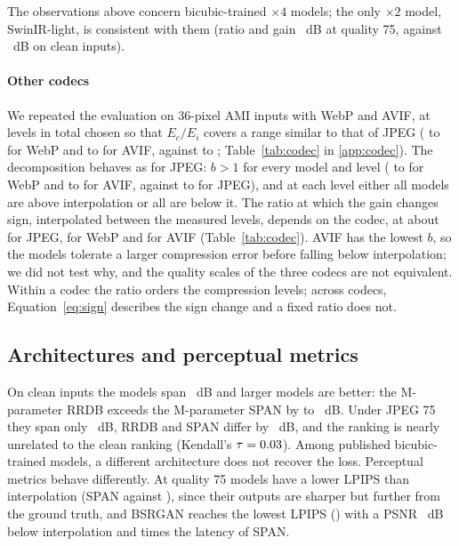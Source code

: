 The observations above concern bicubic-trained $\times4$ models; the only $\times2$ model, SwinIR-light, is consistent with them (ratio \XtwoRatio{} and gain \XtwoGainQLow{}~dB at quality 75, against \XtwoGainClean{}~dB on clean inputs).

\paragraph{Other codecs} We repeated the evaluation on 36-pixel AMI inputs with WebP and AVIF, at \CodecLevels{} levels in total chosen so that $E_c/E_i$ covers a range similar to that of JPEG (\CodecWebpRatioMin{} to \CodecWebpRatioMax{} for WebP and \CodecAvifRatioMin{} to \CodecAvifRatioMax{} for AVIF, against \CodecJpegRatioMin{} to \CodecJpegRatioMax{}; Table~\ref{tab:codec} in \ref{app:codec}). The decomposition behaves as for JPEG: $b>1$ for every model and level (\CodecWebpBMin{} to \CodecWebpBMax{} for WebP and \CodecAvifBMin{} to \CodecAvifBMax{} for AVIF, against \CodecJpegBMin{} to \CodecJpegBMax{} for JPEG), and at each level either all \NPub{} models are above interpolation or all are below it. The ratio at which the gain changes sign, interpolated between the measured levels, depends on the codec, at about \CodecJpegCross{} for JPEG, \CodecWebpCross{} for WebP and \CodecAvifCross{} for AVIF (Table~\ref{tab:codec}). AVIF has the lowest $b$, so the models tolerate a larger compression error before falling below interpolation; we did not test why, and the quality scales of the three codecs are not equivalent. Within a codec the ratio orders the compression levels; across codecs, Equation~\ref{eq:sign} describes the sign change and a fixed ratio does not.

\subsection{Architectures and perceptual metrics}
\label{sec:capacity}
On clean inputs the \NPub{} models span \SpreadClean{}~dB and larger models are better: the \ParamsRrdb{}M-parameter RRDB exceeds the \ParamsSpan{}M-parameter SPAN by \RrdbVsSpanCleanL{} to \RrdbVsSpanCleanS{}~dB. Under JPEG 75 they span only \SpreadQLow{}~dB, RRDB and SPAN differ by \RrdbVsSpanQLowM{}~dB, and the ranking is nearly unrelated to the clean ranking (Kendall's $\tau=0.03$). Among published bicubic-trained models, a different architecture does not recover the loss. Perceptual metrics behave differently. At quality 75 \LpipsQLowBetter{} models have a lower LPIPS than interpolation (SPAN \SpanQLowLpips{} against \BicQLowLpips{}), since their outputs are sharper but further from the ground truth, and BSRGAN reaches the lowest LPIPS (\BsrganQLowLpips{}) with a PSNR \BsrganQLowGap{}~dB below interpolation and \LatRatio{} times the latency of SPAN.
